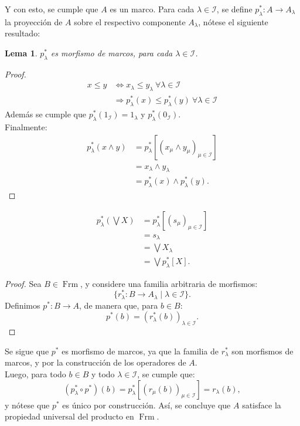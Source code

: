 \documentclass[12pt,letterpaper,titlepage]{article}
\newtheorem*{lemma}{Lema}
\theoremstyle{definition}
\newcommand\<{\langle}
\renewcommand\>{\rangle}
\DeclareMathOperator{\Frm}{Frm}
\begin{document}
Y con esto, se cumple que $A$ es un marco.
    Para cada $\lambda\in\mathscr{I}$, se define $p^*_\lambda:A\to A_\lambda$ la proyección de $A$ sobre el respectivo componente $A_\lambda$, nótese el siguiente resultado:
    \begin{lemma}
        $p^*_\lambda$ es morfismo de marcos, para cada $\lambda\in\mathscr{I}$.\\
    \end{lemma}
        \begin{proof}
            \begin{align*}
                x\leq y & \Longleftrightarrow x_\lambda\leq y_\lambda \ \forall\lambda\in\mathscr{I}\\
                & \Rightarrow p^*_\lambda(x)\leq p^*_\lambda(y)\ \forall\lambda\in\mathscr{I} 
            \end{align*}
            Además se cumple que $p^*_\lambda(1_\mathscr{I})=1_\lambda$ y $p^*_\lambda(0_\mathscr{I})$.\\
            Finalmente:
            \begin{align*}
                p^*_\lambda(x\wedge y) & = p^*_\lambda[(x_\mu\wedge y_\mu)_{\mu\in\mathscr{I}}]\\
                & = x_\lambda\wedge y_\lambda\\
                & = p^*_\lambda(x)\wedge p^*_\lambda(y).
            \end{align*}
        \end{proof}
\begin{align*}
    p^*_\lambda(\bigvee X) & = p^*_\lambda[(s_\mu)_{\mu\in\mathscr{I}}] \\
                           & = s_\lambda \\
                           & = \bigvee X_\lambda \\
                           & = \bigvee p^*_\lambda[X].
\end{align*}
\begin{proof}
    Sea $B\in\Frm$, y considere una familia arbitraria de morfismos:
    \begin{equation*}
        \{r^*_\lambda:B\to A_\lambda\mid\lambda\in\mathscr{I}\}.
    \end{equation*}
    Definimos $p^*:B\to A$, de manera que, para $b\in B$:
    \begin{equation*}
        p^*(b) = (r^*_\lambda(b))_{\lambda\in\mathscr{I}}.
    \end{equation*}
\end{proof}
Se sigue que $p^*$ es morfismo de marcos, ya que la familia de $r^*_\lambda$ son morfismos de marcos, y por la construcción de los operadores de $A$.\\
Luego, para todo $b\in B$ y todo $\lambda\in\mathscr{I}$, se cumple que:
\begin{equation*}
    (p^*_\lambda\circ p^*)(b) = p^*_\lambda[(r_\mu(b))_{\mu\in\mathscr{I}}] = r_\lambda(b),
\end{equation*}
y nótese que $p^*$ es único por construcción. Así, se concluye que $A$ satisface la propiedad universal del producto en $\Frm$.
\end{document}
